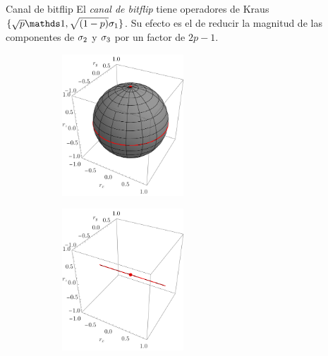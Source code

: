 \begin{frame}{Canal de bitflip}
    El \textit{canal de bitflip} tiene operadores de Kraus $\{\sqrt{p}\Id,\sqrt{(1-p)}\pauli{1}\}$. Su efecto es el de reducir la magnitud de las componentes de $\sigma_{2}$ y $\sigma_{3}$ por un factor de $2p-1$.
    \begin{figure}
        \centering
        \begin{subfigure}{0.45\textwidth}
            \centering
            \includegraphics[width=0.5\textwidth]{figures/whole_sphere.png}
        \end{subfigure}
        \begin{subfigure}{0.45\textwidth}
            \centering
            \includegraphics[width=0.5\textwidth]{figures/bitflip.png}
        \end{subfigure}
    \end{figure}
\end{frame}

